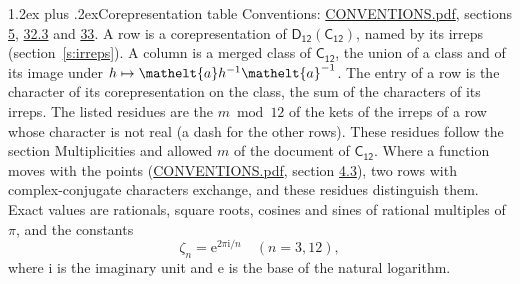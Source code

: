 \documentclass[10pt,a4paper]{article}
\makeatletter
\renewcommand\section{\@startsection{section}{1}{\z@}{-3ex plus -1ex minus -.2ex}%
  {1.2ex plus .2ex}{\normalfont\large\sffamily\bfseries\color{parttitle}}}
\numberwithin{equation}{section}
\newcommand{\eltfont}[1]{{\let\sigma\eltsigma\mathelt{#1}}}
\newcommand{\grp}[1]{\mathsf{#1}}
\newcommand{\elt}[1]{\eltfont{#1}}
\newcommand{\iunit}{\mathrm{i}}
\newcommand{\expe}{\mathrm{e}}
\newcommand{\rootunity}[1]{\zeta_{#1}}
\makeatother
\begin{document}
\section{Corepresentation table}\label{s:character_table}
Conventions: \href{../../CONVENTIONS.pdf}{CONVENTIONS.pdf}, sections \href{../../../rotation/CONVENTIONS.pdf\#conv.5}{5}, \href{../../CONVENTIONS.pdf\#conv.32.3}{32.3} and \href{../../CONVENTIONS.pdf\#conv.33}{33}.
A row is a corepresentation of $\grp{D_{12}}(\grp{C_{12}})$, named by its irreps (section~\ref{s:irreps}). A column is a merged class of $\grp{C_{12}}$, the union of a class and of its image under $h \mapsto \elt{a} h^{-1} \elt{a}^{-1}$. The entry of a row is the character of its corepresentation on the class, the sum of the characters of its irreps.
\leavevmode\label{n:head.parity}The listed residues are the $m \bmod 12$ of the kets of the irreps of a row whose character is not real (a dash for the other rows). These residues follow the section Multiplicities and allowed $m$ of the document of \href{../../../rotation/data/pdf/C12.pdf}{$\grp{C_{12}}$}. Where a function moves with the points (\href{../../CONVENTIONS.pdf}{CONVENTIONS.pdf}, section \href{../../../rotation/CONVENTIONS.pdf\#conv.4.3}{4.3}), two rows with complex-conjugate characters exchange, and these residues distinguish them.
\leavevmode\label{n:constant.root}\label{n:index.root.order}Exact values are rationals, square roots, cosines and sines of rational multiples of $\pi$, and the constants
\begin{equation}\label{e:constants}\rootunity{n} = \expe^{2\pi\iunit/n}\quad(n = 3, 12),\end{equation}
where $\iunit$ is the imaginary unit and $\expe$ is the base of the natural logarithm.
\end{document}
